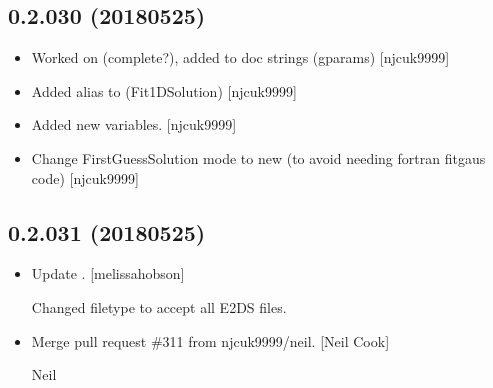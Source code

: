 \documentclass[a4paper,10pt,english]{report}
\begin{document}
\subsection{0.2.030 (2018\sphinxhyphen{}05\sphinxhyphen{}25)}
\label{\detokenize{misc/changelog:id451}}\begin{itemize}
\item {} 
Worked on  (complete?), added to doc strings (gparams)
{[}njcuk9999{]}

\item {} 
Added alias to  (Fit1DSolution) {[}njcuk9999{]}

\item {} 
Added new  variables. {[}njcuk9999{]}

\item {} 
Change FirstGuessSolution mode to new (to avoid needing fortran
fitgaus code) {[}njcuk9999{]}

\end{itemize}


\subsection{0.2.031 (2018\sphinxhyphen{}05\sphinxhyphen{}25)}
\label{\detokenize{misc/changelog:id452}}\begin{itemize}
\item {} 
Update . {[}melissa\sphinxhyphen{}hobson{]}

Changed filetype to accept all E2DS files.

\item {} 
Merge pull request \#311 from njcuk9999/neil. {[}Neil Cook{]}

Neil

\end{itemize}
\end{document}
